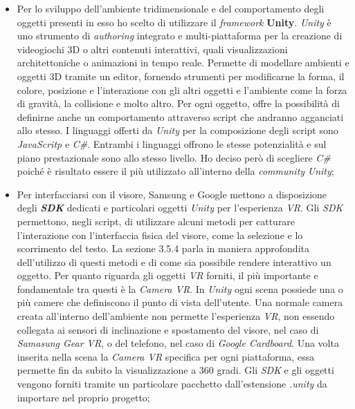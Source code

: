\begin{itemize}
	\item Per lo sviluppo dell'ambiente tridimensionale e del comportamento degli oggetti presenti in esso ho scelto di utilizzare il \textit{framework} \textbf{Unity}. \textit{Unity} è uno strumento di \textit{authoring} integrato e multi-piattaforma per la creazione di videogiochi 3D o altri contenuti interattivi, quali visualizzazioni architettoniche o animazioni in tempo reale. Permette di modellare ambienti e oggetti 3D tramite un editor, fornendo strumenti per modificarne la forma, il colore, posizione e l'interazione con gli altri oggetti e l'ambiente come la forza di gravità, la collisione e molto altro. Per ogni oggetto, offre la possibilità di definirne anche un comportamento attraverso script che andranno agganciati allo stesso. I linguaggi offerti da \textit{Unity} per la composizione degli script sono \textit{JavaScritp} e \textit{C\#}. Entrambi i linguaggi offrono le stesse potenzialità e sul piano prestazionale sono allo stesso livello. Ho deciso però di scegliere \textit{C\#} poiché è risultato essere il più utilizzato all'interno della \textit{community} \textit{Unity};

	\item Per interfacciarsi con il visore, Samsung e Google mettono a disposizione degli \textbf{\textit{SDK}} dedicati e particolari oggetti \textit{Unity} per l'esperienza \textit{VR}. Gli \textit{SDK} permettono, negli script, di utilizzare alcuni metodi per catturare l'interazione con l'interfaccia fisica del visore, come la selezione e lo scorrimento del testo. La sezione 3.5.4 parla in maniera approfondita dell'utilizzo di questi metodi e di come sia possibile rendere interattivo un oggetto. Per quanto riguarda gli oggetti \textit{VR} forniti, il più importante e fondamentale tra questi è la \textit{Camera VR}. In \textit{Unity} ogni scena possiede una o più camere che definiscono il punto di vista dell'utente. Una normale camera creata all'interno dell'ambiente non permette l'esperienza \textit{VR}, non essendo collegata ai sensori di inclinazione e spostamento del visore, nel caso di \textit{Samasung Gear VR}, o del telefono, nel caso di \textit{Google Cardboard}. Una volta inserita nella scena la \textit{Camera VR} specifica per ogni piattaforma, essa permette fin da subito la visualizzazione a 360 gradi. Gli \textit{SDK} e gli oggetti vengono forniti tramite un particolare pacchetto dall'estensione \textit{.unity} da importare nel proprio progetto;


\end{itemize}
